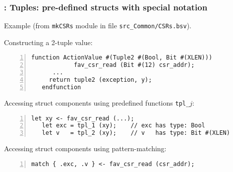 
\begin{frame}[fragile]
\frametitle{{\BSV}: Tuples: pre-defined structs with special notation}

\footnotesize

Example (from {\tt mkCSRs} module in file {\tt src\_Common/CSRs.bsv}).

\vspace{2ex}

Constructing a 2-tuple value:
\begin{Verbatim}[frame=single, numbers=left]
   function ActionValue #(Tuple2 #(Bool, Bit #(XLEN)))
            fav_csr_read (Bit #(12) csr_addr);
      ...
	 return tuple2 (exception, y);
   endfunction
\end{Verbatim}

\PAUSE{\vspace{2ex}}

Accessing struct components using predefined functions {\tt tpl\_$j$}:
\begin{Verbatim}[frame=single, numbers=left]
   let xy <- fav_csr_read (...);
   let exc = tpl_1 (xy);    // exc has type: Bool
   let v   = tpl_2 (xy);    // v   has type: Bit #(XLEN)
\end{Verbatim}

\PAUSE{\vspace{2ex}}

Accessing struct components using pattern-matching:
\begin{Verbatim}[frame=single, numbers=left]
   match { .exc, .v } <- fav_csr_read (csr_addr);
\end{Verbatim}

\end{frame}



